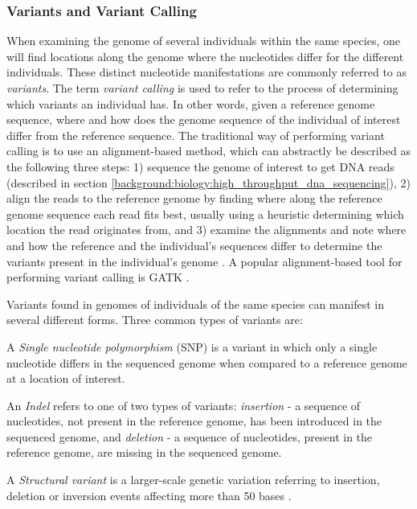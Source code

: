 \subsubsection{Variants and Variant Calling} \label{background:biology:variants_and_variant_calling}
When examining the genome of several individuals within the same species, one will find locations along the genome where the nucleotides differ for the different individuals.
These distinct nucleotide manifestations are commonly referred to as \textit{variants}.
The term \textit{variant calling} is used to refer to the process of determining which variants an individual has.
In other words, given a reference genome sequence, where and how does the genome sequence of the individual of interest differ from the reference sequence.
The traditional way of performing variant calling is to use an alignment-based method, which can abstractly be described as the following three steps:
1) sequence the genome of interest to get DNA reads (described in section \ref{background:biology:high_throughput_dna_sequencing}), 
2) align the reads to the reference genome by finding where along the reference genome sequence each read fits best, usually using a heuristic determining which location the read originates from, and 
3) examine the alignments and note where and how the reference and the individual's sequences differ to determine the variants present in the individual's genome \cite{variant_calling}.
A popular alignment-based tool for performing variant calling is GATK \cite{gatk}.

Variants found in genomes of individuals of the same species can manifest in several different forms.
Three common types of variants are:
\begin{compactitem}
  \item A \textit{Single nucleotide polymorphism} (SNP) is a variant in which only a single nucleotide differs in the sequenced genome when compared to a reference genome at a location of interest.
  \item An \textit{Indel} refers to one of two types of variants: \textit{insertion} - a sequence of nucleotides, not present in the reference genome, has been introduced in the sequenced genome, and \textit{deletion} - a sequence of nucleotides, present in the reference genome, are missing in the sequenced genome.
  \item A \textit{Structural variant} is a larger-scale genetic variation referring to insertion, deletion or inversion events affecting more than 50 bases \cite{structural_variant_size}.
\end{compactitem}

